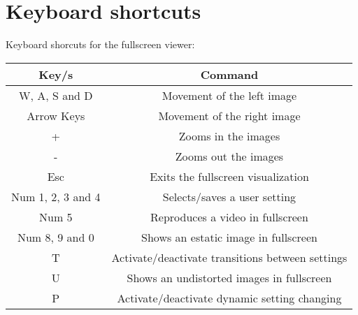 \documentclass[]{article}
\title{}
\author{}
\begin{document}
\section*{Keyboard shortcuts}
Keyboard shorcuts for the fullscreen viewer:
\def\arraystretch{1.5}

	\begin{table}[!h]
	\begin{center}
		\begin{tabular}{|c|c|}
			\hline 
			Key/s & Command \\ 
			\hline 
			\hline 
			W, A, S and D & Movement of the left image \\ 
			\hline 
			Arrow Keys & Movement of the right image   \\ 
			\hline 
			+ & Zooms in the images \\ 
			\hline 
			- & Zooms out the images \\ 
			\hline 
			Esc & Exits the fullscreen visualization \\ 
			\hline 
			Num 1, 2, 3 and 4 & Selects/saves a user setting \\ 
			\hline 
			Num 5 & Reproduces a video in fullscreen \\ 
			\hline 
			Num 8, 9 and 0 & Shows an estatic image in fullscreen \\ 
			\hline 
			T & Activate/deactivate transitions between settings \\ 
			\hline 
			U & Shows an undistorted images in fullscreen  \\ 
			\hline 
			P & Activate/deactivate dynamic setting changing \\ 
			\hline 
		\end{tabular} 
	\end{center}
\end{table}
\end{document}
